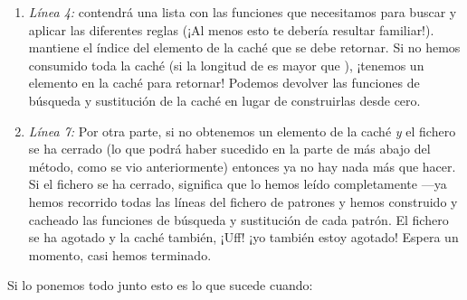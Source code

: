 \begin{enumerate}

\item \emph{Línea 4:}  contendrá una lista con las funciones que necesitamos para buscar y aplicar las diferentes reglas (¡Al menos esto te debería resultar familiar!).  mantiene el índice del elemento de la caché que se debe retornar. Si no hemos consumido toda la caché (si la longitud de  es mayor que ), ¡tenemos un elemento en la caché para retornar! Podemos devolver las funciones de búsqueda y sustitución de la caché en lugar de construirlas desde cero.
 
\item \emph{Línea 7:} Por otra parte, si no obtenemos un elemento de la caché \emph{y} el fichero se ha cerrado (lo que podrá haber sucedido en la parte de más abajo del método, como se vio anteriormente) entonces ya no hay nada más que hacer. Si el fichero se ha cerrado, significa que lo hemos leído completamente ---ya hemos recorrido todas las líneas del fichero de patrones y hemos construido y cacheado las funciones de búsqueda y sustitución de cada patrón. El fichero se ha agotado y la caché también, ¡Uff! ¡yo también estoy agotado! Espera un momento, casi hemos terminado.

\end{enumerate}

Si lo ponemos todo junto esto es lo que sucede cuando:

